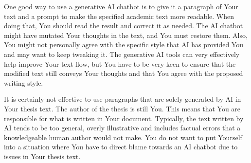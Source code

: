 One good way to use a generative AI chatbot is to give it a paragraph of Your text and a prompt to make the specified academic text more readable. When doing that, You should read the result and correct it as needed. The AI chatbot might have mutated Your thoughts in the text, and You must restore them. Also, You might not personally agree with the specific style that AI has provided You and may want to keep tweaking it. The generative AI tools can very effectively help improve Your text flow, but You have to be very keen to ensure that the modified text still conveys Your thoughts and that You agree with the proposed writing style.

It is certainly not effective to use paragraphs that are solely generated by AI in Your thesis text. The author of the thesis is still You. This means that You are responsible for what is written in Your document. Typically, the text written by AI tends to be too general, overly illustrative and includes factual errors that a knowledgeable human author would not make. You do not want to put Yourself into a situation where You have to direct blame towards an AI chatbot due to issues in Your thesis text.
